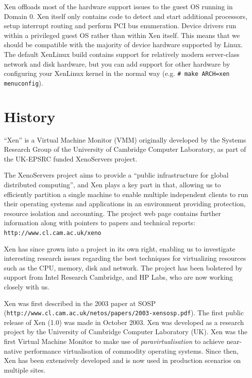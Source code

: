 \documentclass[11pt,twoside,final,openright]{xenstyle}
\begin{document}
Xen offloads most of the hardware support issues to the guest OS
running in Domain 0.  Xen itself only contains code to detect and
start additional processors, setup interrupt routing and perform PCI
bus enumeration.  Device drivers run within a privileged guest OS
rather than within Xen itself.  This means that we should be
compatible with the majority of device hardware supported by Linux.
The default XenLinux build contains support for relatively modern
server-class network and disk hardware, but you can add support for
other hardware by configuring your XenLinux kernel in the normal way
(e.g. \verb_# make ARCH=xen menuconfig_).

\section{History}


``Xen'' is a Virtual Machine Monitor (VMM) originally developed by the
Systems Research Group of the University of Cambridge Computer
Laboratory, as part of the UK-EPSRC funded XenoServers project.

The XenoServers project aims to provide a ``public infrastructure for
global distributed computing'', and Xen plays a key part in that,
allowing us to efficiently partition a single machine to enable
multiple independent clients to run their operating systems and
applications in an environment providing protection, resource
isolation and accounting.  The project web page contains further
information along with pointers to papers and technical reports:
{\tt http://www.cl.cam.ac.uk/xeno}

Xen has since grown into a project in its own right, enabling us to
investigate interesting research issues regarding the best techniques
for virtualizing resources such as the CPU, memory, disk and network.
The project has been bolstered by support from Intel Research
Cambridge, and HP Labs, who are now working closely with us.

Xen was first described in the 2003 paper at SOSP \\
({\tt http://www.cl.cam.ac.uk/netos/papers/2003-xensosp.pdf}).
The first public release of Xen (1.0) was made in October 2003.  Xen
was developed as a research project by the University of Cambridge
Computer Laboratory (UK).  Xen was the first Virtual Machine Monitor
to make use of {\em paravirtualisation} to achieve near-native
performance virtualisation of commodity operating systems.  Since
then, Xen has been extensively developed and is now used in production
scenarios on multiple sites.
\end{document}
